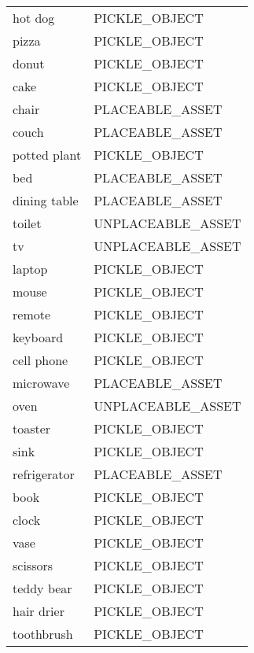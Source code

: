 \begin{supertabular}{|l|l|}
  hot dog               & \tiny{PICKLE\_OBJECT    } \\
  pizza                 & \tiny{PICKLE\_OBJECT    } \\
  donut                 & \tiny{PICKLE\_OBJECT    } \\
  cake                  & \tiny{PICKLE\_OBJECT    } \\
  chair                 & \tiny{PLACEABLE\_ASSET  } \\
  couch                 & \tiny{PLACEABLE\_ASSET  } \\
  potted plant          & \tiny{PICKLE\_OBJECT    } \\
  bed                   & \tiny{PLACEABLE\_ASSET  } \\
  dining table          & \tiny{PLACEABLE\_ASSET  } \\
  toilet                & \tiny{UNPLACEABLE\_ASSET} \\
  tv                    & \tiny{UNPLACEABLE\_ASSET} \\
  laptop                & \tiny{PICKLE\_OBJECT    } \\
  mouse                 & \tiny{PICKLE\_OBJECT    } \\
  remote                & \tiny{PICKLE\_OBJECT    } \\
  keyboard              & \tiny{PICKLE\_OBJECT    } \\
  cell phone            & \tiny{PICKLE\_OBJECT    } \\
  microwave             & \tiny{PLACEABLE\_ASSET  } \\
  oven                  & \tiny{UNPLACEABLE\_ASSET} \\
  toaster               & \tiny{PICKLE\_OBJECT    } \\
  sink                  & \tiny{PICKLE\_OBJECT    } \\
  refrigerator          & \tiny{PLACEABLE\_ASSET  } \\
  book                  & \tiny{PICKLE\_OBJECT    } \\
  clock                 & \tiny{PICKLE\_OBJECT    } \\
  vase                  & \tiny{PICKLE\_OBJECT    } \\
  scissors              & \tiny{PICKLE\_OBJECT    } \\
  teddy bear            & \tiny{PICKLE\_OBJECT    } \\
  hair drier            & \tiny{PICKLE\_OBJECT    } \\
  toothbrush            & \tiny{PICKLE\_OBJECT    } \\

\end{supertabular}

